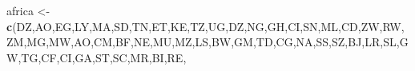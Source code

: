 \documentclass[
]{article}
\newenvironment{Shaded}{\begin{snugshade}}{\end{snugshade}}
\newcommand{\FunctionTok}[1]{\textcolor[rgb]{0.13,0.29,0.53}{\textbf{#1}}}
\newcommand{\NormalTok}[1]{#1}
\newcommand{\OtherTok}[1]{\textcolor[rgb]{0.56,0.35,0.01}{#1}}
\newcommand{\StringTok}[1]{\textcolor[rgb]{0.31,0.60,0.02}{#1}}
\begin{document}
\begin{Shaded}
\begin{Highlighting}[]



\NormalTok{africa }\OtherTok{\textless{}{-}} \FunctionTok{c}\NormalTok{(}\StringTok{\textquotesingle{}DZ\textquotesingle{}}\NormalTok{,}\StringTok{\textquotesingle{}AO\textquotesingle{}}\NormalTok{,}\StringTok{\textquotesingle{}EG\textquotesingle{}}\NormalTok{,}\StringTok{\textquotesingle{}LY\textquotesingle{}}\NormalTok{,}\StringTok{\textquotesingle{}MA\textquotesingle{}}\NormalTok{,}\StringTok{\textquotesingle{}SD\textquotesingle{}}\NormalTok{,}\StringTok{\textquotesingle{}TN\textquotesingle{}}\NormalTok{,}\StringTok{\textquotesingle{}ET\textquotesingle{}}\NormalTok{,}\StringTok{\textquotesingle{}KE\textquotesingle{}}\NormalTok{,}\StringTok{\textquotesingle{}TZ\textquotesingle{}}\NormalTok{,}\StringTok{\textquotesingle{}UG\textquotesingle{}}\NormalTok{,}\StringTok{\textquotesingle{}DZ\textquotesingle{}}\NormalTok{,}\StringTok{\textquotesingle{}NG\textquotesingle{}}\NormalTok{,}\StringTok{\textquotesingle{}GH\textquotesingle{}}\NormalTok{,}\StringTok{\textquotesingle{}CI\textquotesingle{}}\NormalTok{,}\StringTok{\textquotesingle{}SN\textquotesingle{}}\NormalTok{,}\StringTok{\textquotesingle{}ML\textquotesingle{}}\NormalTok{,}\StringTok{\textquotesingle{}CD\textquotesingle{}}\NormalTok{,}\StringTok{\textquotesingle{}ZW\textquotesingle{}}\NormalTok{,}\StringTok{\textquotesingle{}RW\textquotesingle{}}\NormalTok{,}\StringTok{\textquotesingle{}ZM\textquotesingle{}}\NormalTok{,}\StringTok{\textquotesingle{}MG\textquotesingle{}}\NormalTok{,}\StringTok{\textquotesingle{}MW\textquotesingle{}}\NormalTok{,}\StringTok{\textquotesingle{}AO\textquotesingle{}}\NormalTok{,}\StringTok{\textquotesingle{}CM\textquotesingle{}}\NormalTok{,}\StringTok{\textquotesingle{}BF\textquotesingle{}}\NormalTok{,}\StringTok{\textquotesingle{}NE\textquotesingle{}}\NormalTok{,}\StringTok{\textquotesingle{}MU\textquotesingle{}}\NormalTok{,}\StringTok{\textquotesingle{}MZ\textquotesingle{}}\NormalTok{,}\StringTok{\textquotesingle{}LS\textquotesingle{}}\NormalTok{,}\StringTok{\textquotesingle{}BW\textquotesingle{}}\NormalTok{,}\StringTok{\textquotesingle{}GM\textquotesingle{}}\NormalTok{,}\StringTok{\textquotesingle{}TD\textquotesingle{}}\NormalTok{,}\StringTok{\textquotesingle{}CG\textquotesingle{}}\NormalTok{,}\StringTok{\textquotesingle{}NA\textquotesingle{}}\NormalTok{,}\StringTok{\textquotesingle{}SS\textquotesingle{}}\NormalTok{,}\StringTok{\textquotesingle{}SZ\textquotesingle{}}\NormalTok{,}\StringTok{\textquotesingle{}BJ\textquotesingle{}}\NormalTok{,}\StringTok{\textquotesingle{}LR\textquotesingle{}}\NormalTok{,}\StringTok{\textquotesingle{}SL\textquotesingle{}}\NormalTok{,}\StringTok{\textquotesingle{}GW\textquotesingle{}}\NormalTok{,}\StringTok{\textquotesingle{}TG\textquotesingle{}}\NormalTok{,}\StringTok{\textquotesingle{}CF\textquotesingle{}}\NormalTok{,}\StringTok{\textquotesingle{}CI\textquotesingle{}}\NormalTok{,}\StringTok{\textquotesingle{}GA\textquotesingle{}}\NormalTok{,}\StringTok{\textquotesingle{}ST\textquotesingle{}}\NormalTok{,}\StringTok{\textquotesingle{}SC\textquotesingle{}}\NormalTok{,}\StringTok{\textquotesingle{}MR\textquotesingle{}}\NormalTok{,}\StringTok{\textquotesingle{}BI\textquotesingle{}}\NormalTok{,}\StringTok{\textquotesingle{}RE\textquotesingle{}}\NormalTok{,}\StringT
\end{Highlighting}
\end{Shaded}
\end{document}

